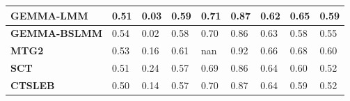 \documentclass[pdflatex,sn-nature]{sn-jnl}%
\begin{document}
\begin{table}[!ht]
{\begin{tabular}{|l|l|l|l|l|l|l|l|l|}
\textbf{GEMMA-LMM}  \cite{Zhou_2012}         & \cellcolor[HTML]{FA9473}0.51 & \cellcolor[HTML]{F8706C}0.03 & \cellcolor[HTML]{EAE583}0.59 & \cellcolor[HTML]{D2DE82}0.71                                                     & \cellcolor[HTML]{ECE683}0.87                                         & \cellcolor[HTML]{FBB078}0.62                                                 & \cellcolor[HTML]{99CE7F}0.65                                                    & \cellcolor[HTML]{7DC67D}0.59 \\ \hline
\textbf{GEMMA-BSLMM}   \cite{Zhou_2012}      & \cellcolor[HTML]{F1E784}0.54 & \cellcolor[HTML]{F8696B}0.02 & \cellcolor[HTML]{FDD27F}0.58 & \cellcolor[HTML]{FED980}0.70                                                     & \cellcolor[HTML]{FDEB84}0.86                                         & \cellcolor[HTML]{FEDB81}0.63                                                 & \cellcolor[HTML]{F98470}0.58                                                    & \cellcolor[HTML]{F2E884}0.55 \\ \hline
\textbf{MTG2}       \cite{Lee_2016}         & \cellcolor[HTML]{FEE182}0.53 & \cellcolor[HTML]{FCBD7B}0.16 & \cellcolor[HTML]{BED981}0.61 & nan                                                                              & \cellcolor[HTML]{81C77D}0.92                                         & \cellcolor[HTML]{A2D17F}0.66                                                 & \cellcolor[HTML]{63BE7B}0.68                                                    & \cellcolor[HTML]{73C37C}0.60 \\ \hline
\textbf{SCT}    \cite{Priv__2019}             & \cellcolor[HTML]{FA9272}0.51 & \cellcolor[HTML]{F5E884}0.24 & \cellcolor[HTML]{FDCE7E}0.57 & \cellcolor[HTML]{FDC77D}0.69                                                     & \cellcolor[HTML]{FAEA84}0.86                                         & \cellcolor[HTML]{EFE784}0.64                                                 & \cellcolor[HTML]{EFE784}0.60                                                    & \cellcolor[HTML]{F8696B}0.52 \\ \hline
\textbf{CTSLEB}    \cite{Chung_2021}          & \cellcolor[HTML]{F98770}0.50 & \cellcolor[HTML]{FCB679}0.14 & \cellcolor[HTML]{FCBA7A}0.57 & \cellcolor[HTML]{FEDF81}0.70                                                     & \cellcolor[HTML]{EFE784}0.87                                         & \cellcolor[HTML]{FCEA84}0.64                                                 & \cellcolor[HTML]{FCC37C}0.59                                                    & \cellcolor[HTML]{F8706C}0.52 \\ \hline

\end{tabular}}
\end{table}
\end{document}
